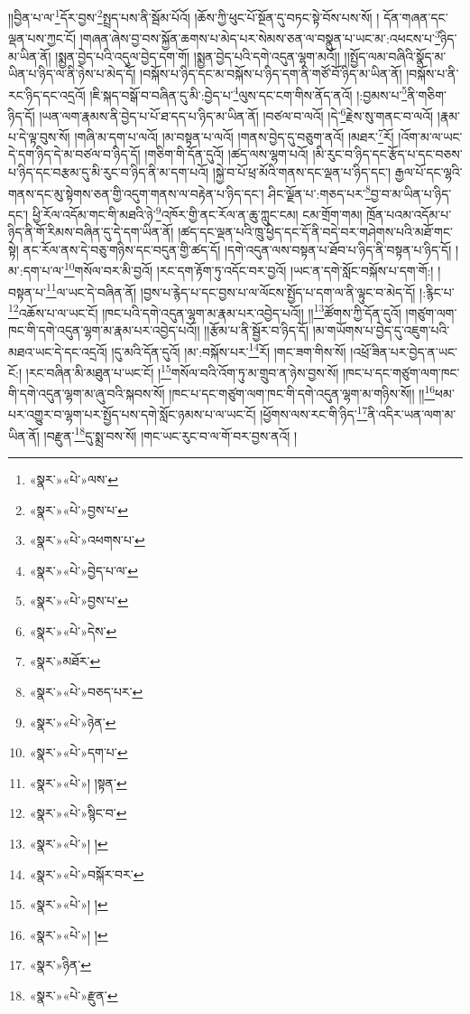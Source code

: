 །།བྱིན་པ་ལ་\footnote{«སྣར་»«པེ་»ལས་}དོར་བྱས་\footnote{«སྣར་»«པེ་»བྱས་པ་}སྤྲད་པས་ནི་སྦོམ་པོའོ། །ཆོས་ཀྱི་ཕུང་པོ་སྔོན་དུ་བཏང་སྟེ་བོས་པས་སོ། །
དོན་གཞན་དང་ལྡན་པས་ཀྱང་ངོ། །གཞན་ཞེས་བྱ་བས་སྐྱོན་ཆགས་པ་མེད་པར་སེམས་ཅན་ལ་བསྣུན་པ་ཡང་མ་:འཕངས་པ་\footnote{«སྣར་»«པེ་»འཕགས་པ་}ཉིད་མ་ཡིན་ནོ། །སྨྱན་བྱེད་པའི་འདུལ་བྱེད་དག་གོ། །སྨྱན་བྱེད་པའི་དགེ་འདུན་ལྷག་མའོ།། །།སྤྱོད་ལམ་བཞིའི་སྣོད་མ་ཡིན་པ་ཉིད་ལ་ནི་ཉེས་པ་མེད་དོ། །བསྐོས་པ་ཉིད་དང་མ་བསྐོས་པ་ཉིད་དག་ནི་གཙོ་བོ་ཉིད་མ་ཡིན་ནོ། །བསྐོས་པ་ནི་རང་ཉིད་དང་འདྲའོ། །ཇི་སྐད་བསྒོ་བ་བཞིན་དུ་མི་:བྱེད་པ་\footnote{«སྣར་»«པེ་»བྱེད་པ་ལ་}ལུས་དང་ངག་གིས་ནོད་ནའོ། །:བྱམས་པ་\footnote{«སྣར་»«པེ་»བྱས་པ་}ནི་གཅིག་ཉིད་དོ། །ཡན་ལག་རྣམས་ནི་བྱེད་པ་པོ་ཐ་དད་པ་ཉིད་མ་ཡིན་ནོ། །བཙལ་བ་ལའོ། །དེ་\footnote{«སྣར་»«པེ་»དེས་}རྗེས་སུ་གནང་བ་ལའོ། །རྣམ་པ་དེ་ལྟ་བུས་སོ། །གཞི་མ་དག་པ་ལའོ། །མ་བསྟན་པ་ལའོ། །གནས་བྱེད་དུ་བཅུག་ནའོ། །མཐར་\footnote{«སྣར་»མཐོར་}རོ། །འོག་མ་ལ་ཡང་དེ་དག་ཉིད་དེ་མ་བཙལ་བ་ཉིད་དོ། །གཅིག་གི་དོན་དུའོ། །ཚད་ལས་ལྷག་པའོ། །མི་རུང་བ་ཉིད་དང་རྩོད་པ་དང་བཅས་པ་ཉིད་དང་བརྩམ་དུ་མི་རུང་བ་ཉིད་ནི་མ་དག་པའོ། །སྐྱེ་བ་པོ་ཕྲ་མོའི་གནས་དང་ལྡན་པ་ཉིད་དང་། རྒྱལ་པོ་དང་ལྷའི་གནས་དང་མུ་སྟེགས་ཅན་གྱི་འདུག་གནས་ལ་བརྟེན་པ་ཉིད་དང་། ཤིང་ལྗོན་པ་:གཅད་པར་\footnote{«སྣར་»«པེ་»བཅད་པར་}བྱ་བ་མ་ཡིན་པ་ཉིད་དང་། ཕྱི་རོལ་འདོམ་གང་གི་མཐའི་ཉེ་\footnote{«སྣར་»«པེ་»ཉེན་}འཁོར་གྱི་ནང་རོལ་ན་ཆུ་ཀླུང་ངམ། ངམ་གྲོག་གམ། ཁྲོན་པའམ་འདོམ་པ་ཉིད་ནི་གོ་རིམས་བཞིན་དུ་དེ་དག་ཡིན་ནོ། །ཚད་དང་ལྡན་པའི་ཁྲུ་ཕྱེད་དང་དོ་ནི་བདེ་བར་གཤེགས་པའི་མཐོ་གང་སྟེ། ནང་རོལ་ནས་དེ་བཅུ་གཉིས་དང་བདུན་གྱི་ཚད་དོ། །དགེ་འདུན་ལས་བསྟན་པ་ཐོབ་པ་ཉིད་ནི་བསྟན་པ་ཉིད་དོ། །མ་:དག་པ་ལ་\footnote{«སྣར་»«པེ་»དག་པ་}གསོལ་བར་མི་བྱའོ། །རང་དག་རྟོག་ཏུ་འདོང་བར་བྱའོ། །ཡང་ན་དགེ་སློང་བསྐོས་པ་དག་གོ:། །བསྟན་པ་\footnote{«སྣར་»«པེ་»། །སྟན་}ལ་ཡང་དེ་བཞིན་ནོ། །བྱས་པ་རྙེད་པ་དང་བྱས་པ་ལ་ལོངས་སྤྱོད་པ་དག་ལ་ནི་ལྟུང་བ་མེད་དོ། །:རྙིང་པ་\footnote{«སྣར་»«པེ་»སྙིང་བ་}འཆོས་པ་ལ་ཡང་ངོ། །ཁང་པའི་དགེ་འདུན་ལྷག་མ་རྣམ་པར་འབྱེད་པའོ།། །།\footnote{«སྣར་»«པེ་»། །}ཚོགས་ཀྱི་དོན་དུའོ། །གཙུག་ལག་ཁང་གི་དགེ་འདུན་ལྷག་མ་རྣམ་པར་འབྱེད་པའོ།། །།རྩོམ་པ་ནི་སྦྱོར་བ་ཉིད་དོ། །མ་གཡོགས་པ་བྱེད་དུ་འཇུག་པའི་མཐའ་ཡང་དེ་དང་འདྲའོ། །དུ་མའི་དོན་དུའོ། །མ་:བསྐོས་པར་\footnote{«སྣར་»«པེ་»བསྐོར་བར་}རོ། །གང་ཟག་གིས་སོ། །འཕྲོ་ཟིན་པར་བྱེད་ན་ཡང་ངོ:། །རང་བཞིན་མི་མཐུན་པ་ཡང་ངོ། །\footnote{«སྣར་»«པེ་»། །}གསོལ་བའི་འོག་ཏུ་མ་གྲུབ་ན་ཉེས་བྱས་སོ། །ཁང་པ་དང་གཙུག་ལག་ཁང་གི་དགེ་འདུན་ལྷག་མ་ཞུ་བའི་སྐབས་སོ། །ཁང་པ་དང་གཙུག་ལག་ཁང་གི་དགེ་འདུན་ལྷག་མ་གཉིས་སོ།། །།\footnote{«སྣར་»«པེ་»། །}ཕམ་པར་འགྱུར་བ་ལྷག་པར་སྤྱོད་པས་དགེ་སློང་ཉམས་པ་ལ་ཡང་ངོ། །ཕྱོགས་ལས་རང་གི་ཉིད་\footnote{«སྣར་»ཉིན་}ནི་འདིར་ཡན་ལག་མ་ཡིན་ནོ། །བརྫུན་\footnote{«སྣར་»«པེ་»རྫུན་}དུ་སྨྲ་བས་སོ། །གང་ཡང་རུང་བ་ལ་གོ་བར་བྱས་ནའོ། །
